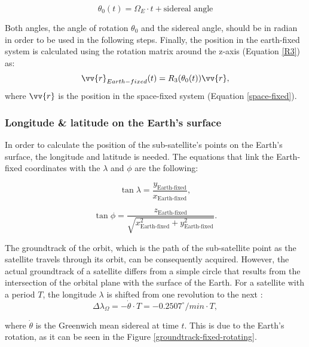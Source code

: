 \begin{equation}
\label{theta_angle}
\theta_{0}(t) = \Omega_{E} \cdot t + \text{sidereal angle}
\end{equation}

Both angles, the angle of rotation $\theta_{0}$ and the sidereal angle, should be in radian in order to be used in the following steps. Finally, the position in the earth-fixed system is calculated using the rotation matrix around the z-axis (Equation \ref{R3}) as:
\begin{equation}
\vv{r}_{Earth-fixed}(t) = R_{3}(\theta_{0}(t)) \vv{r},
\end{equation}
where $\vv{r}$ is the position in the space-fixed system (Equation \ref{space-fixed}).

\bigskip
\subsubsection{Longitude \& latitude on the Earth's surface}
\bigskip

In order to calculate the position of the sub-satellite's points on the Earth's surface, the longitude and latitude is needed. The equations that link the Earth-fixed coordinates with the $\lambda$ and $\phi$ are the following:

\begin{equation}
\tan{\lambda} = \frac{y_{\text{Earth-fixed}}}{x_{\text{Earth-fixed}}},
\end{equation}

\begin{equation}
\tan{\phi} = \frac{z_{\text{Earth-fixed}}}{\sqrt{x^2_{\text{Earth-fixed}} + y^2_{\text{Earth-fixed}}}}.
\end{equation}

The groundtrack of the orbit, which is the path of the sub-satellite point as the satellite travels through its orbit, can be consequently acquired. However, the actual groundtrack of a satellite differs from a simple circle that results from the intersection of the orbital plane with the surface of the Earth. For a satellite with a period $T$, the longitude $\lambda$ is shifted from one revolution to the next \cite{Montenbruck} :
\begin{equation}
\Delta \lambda_{\Omega} = - \dot{\theta} \cdot T = - 0.2507^{\circ}/ min \cdot T,
\end{equation}

where $\dot{\theta}$ is the Greenwich mean sidereal at time $t$. This is due to the Earth's rotation, as it can be seen in the Figure \ref{groundtrack-fixed-rotating}.

